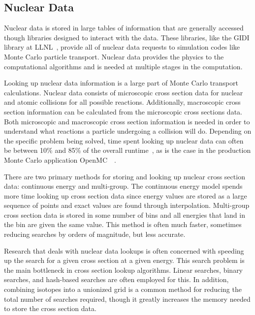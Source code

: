 \subsection{\textbf{Nuclear Data}}

Nuclear data is stored in large tables of information that are generally accessed though libraries designed to interact with the data.
%
These libraries, like the GIDI library at LLNL~\cite{mckinley2015implementation}, provide all of nuclear data requests to simulation codes like Monte Carlo particle transport.
%
Nuclear data provides the physics to the computational algorithms and is needed at multiple stages in the computation.

Looking up nuclear data information is a large part of Monte Carlo transport calculations.
%
Nuclear data consists of microscopic cross section data for nuclear and atomic collisions for all possible reactions.
%
Additionally, macroscopic cross section information can be calculated from the microscopic cross sections data.
%
Both microscopic and macroscopic cross section information is needed in order to understand what reactions a particle undergoing a collision will do.
%
Depending on the specific problem being solved, time spent looking up nuclear data can often be between 10\% and 85\% of the overall runtime~\cite{tramm2014xsbench}, as is the case in the production Monte Carlo application OpenMC~\cite{romano2013openmc}~\cite{romano2015openmc}.

There are two primary methods for storing and looking up nuclear cross section data: continuous energy and multi-group.
%
The continuous energy model spends more time looking up cross section data since energy values are stored as a large sequence of points and exact values are found through interpolation.
%
Multi-group cross section data is stored in some number of bins and all energies that land in the bin are given the same value. 
%
This method is often much faster, sometimes reducing searches by orders of magnitude, but less accurate.
%

%
Research that deals with nuclear data lookups is often concerned with speeding up the search for a given cross section at a given energy.
%
This search problem is the main bottleneck in cross section lookup algorithms.
%
Linear searches, binary searches, and hash-based searches are often employed for this.
%
In addition, combining isotopes into a unionized grid is a common method for reducing the total number of searches required, though it greatly increases the memory needed to store the cross section data.
%

